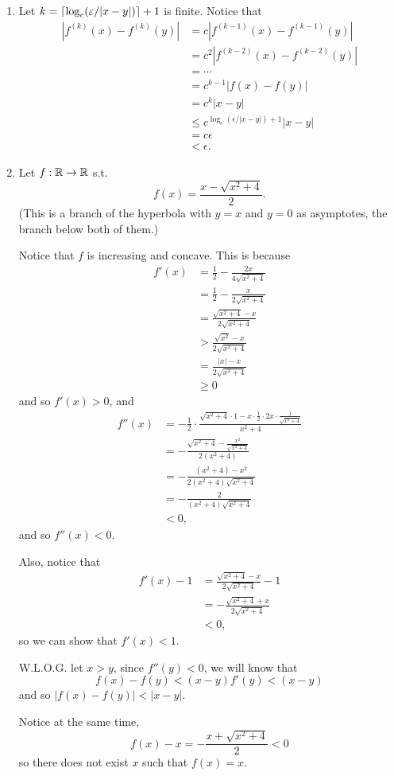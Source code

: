 \begin{enumerate}
    \item Let \(k = \lceil\log_c(\varepsilon/|x-y|)\rceil + 1\) is finite. Notice that 
    \begin{align*}
        |f^{(k)}(x) - f^{(k)}(y)| &= c|f^{(k-1)}(x) - f^{(k-1)}(y)|\\
        &= c^2|f^{(k-2)}(x) - f^{(k-2)}(y)|\\
        &= \cdots\\
        &= c^{k-1}|f(x) - f(y)|\\
        &= c^k |x - y|\\
        &\leq c^{\log_c(\epsilon/|x-y|)+1} |x-y|\\
        &= c\epsilon\\
        &< \epsilon.
    \end{align*}
    
    \item Let \(f: \mathbb{R} \to \mathbb{R}\) s.t.
    \[
        f(x) = \frac{x-\sqrt{x^2+4}}{2}.
    \]
    (This is a branch of the hyperbola with \(y=x\) and \(y=0\) as asymptotes, the branch below both of them.)

    Notice that \(f\) is increasing and concave. This is because
    \begin{align*}
        f'(x) &= \frac{1}{2} - \frac{2x}{4\sqrt{x^2+4}}\\
        &= \frac{1}{2} - \frac{x}{2\sqrt{x^2+4}}\\
        &= \frac{\sqrt{x^2+4}-x}{2\sqrt{x^2+4}}\\
        &> \frac{\sqrt{x^2}-x}{2\sqrt{x^2+4}}\\
        &= \frac{|x|-x}{2\sqrt{x^2+4}}\\
        &\geq 0
    \end{align*}
    and so \(f'(x)>0\), and
    \begin{align*}
        f''(x) &= -\frac{1}{2} \cdot \frac{\sqrt{x^2+4} \cdot 1 - x \cdot \frac{1}{2} \cdot 2x \cdot \frac{1}{\sqrt{x^2+4}}}{x^2+4}\\
        &= -\frac{\sqrt{x^2+4} - \frac{x^2}{\sqrt{x^2+4}}}{2(x^2+4)}\\
        &= -\frac{(x^2+4) - x^2}{2(x^2+4)\sqrt{x^2+4}}\\
        &= -\frac{2}{(x^2+4)\sqrt{x^2+4}}\\
        &< 0,
    \end{align*}
    and so \(f''(x) < 0\).
    
    Also, notice that
    \begin{align*}
        f'(x) - 1 &= \frac{\sqrt{x^2 + 4} -x }{2\sqrt{x^2 + 4}} - 1\\
        &= - \frac{\sqrt{x^2 + 4} +x }{2\sqrt{x^2 + 4}}\\
        &<0,
    \end{align*}
    so we can show that \(f'(x) < 1\).
    
    W.L.O.G. let \(x > y\), since \(f''(y) < 0\), we will know that
    \[
        f(x) - f(y) < (x - y)f'(y) < (x-y)
    \]
    and so \(|f(x) - f(y)| < |x-y|\).
    
    Notice at the same time,
    \[
    f(x) - x = -\frac{x+\sqrt{x^2+4}}{2} < 0
    \]
    so there does not exist \(x\) such that \(f(x) = x\).
\end{enumerate}